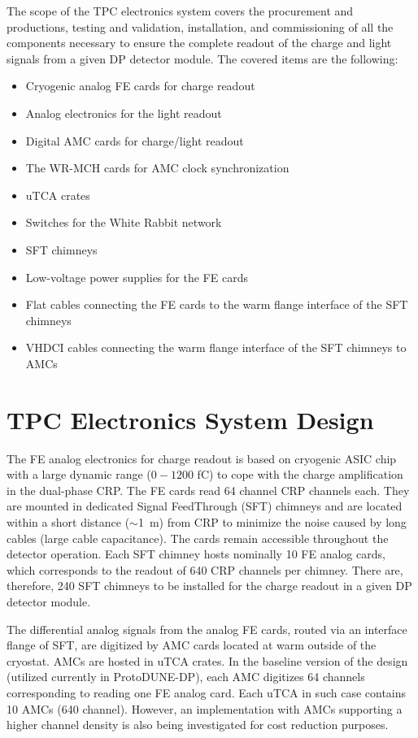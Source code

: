 The scope of the TPC electronics system covers the procurement and productions, testing and validation, installation, and commissioning of all the components necessary to ensure the complete readout of the charge and light signals from a given DP detector module. The covered items are the following:
\begin{itemize}
\item{Cryogenic analog FE cards for charge readout}
\item{Analog electronics for the light readout}
\item{Digital AMC cards for charge/light readout}
\item{The WR-MCH cards for AMC clock synchronization}
\item{uTCA crates}
\item{Switches for the White Rabbit network}
\item{SFT chimneys}
\item{Low-voltage power supplies for the FE cards}
\item{Flat cables connecting the FE cards to the warm flange interface of the SFT chimneys}
\item{VHDCI cables connecting the warm flange interface of the SFT chimneys to AMCs}
\end{itemize}



\section{TPC Electronics System Design}
\label{sec:fddp-tpc-elec-design}

The FE analog electronics for charge readout is based on cryogenic ASIC chip with a large dynamic range ($0-1200$ \si{fC}) to cope with the charge amplification in the dual-phase CRP. The FE cards read \num{64} channel CRP channels each. They are mounted in dedicated Signal FeedThrough (SFT) chimneys and are located within a short distance ($\sim$\SI{1}{\metre}) from CRP to minimize the noise caused by long cables (large cable capacitance). The cards remain accessible throughout the detector operation. Each SFT chimney hosts nominally \num{10} FE analog cards, which corresponds to the readout of \num{640} CRP channels per chimney. There are, therefore, \num{240} SFT chimneys to be installed for the charge readout in a given DP detector module.   

The differential analog signals from the analog FE cards, routed via an interface flange of SFT, are digitized by AMC cards located at warm outside of the cryostat. AMCs are hosted in uTCA crates. In the baseline version of the design (utilized currently in ProtoDUNE-DP), each AMC digitizes \num{64} channels corresponding to reading one FE analog card. Each uTCA in such case contains \num{10} AMCs (\num{640} channel). However, an implementation with AMCs supporting a higher channel density is also being investigated for cost reduction purposes. 

